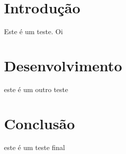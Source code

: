 





    \tableofcontents

    \section{Introdução}
        Este é um teste. Oi \cite{teste}

    \section{Desenvolvimento}
        este é um outro teste
    
    \section{Conclusão}
        este é um teste final
    
   
    \printbibliography[title=Referências Bibliográficas]
        



